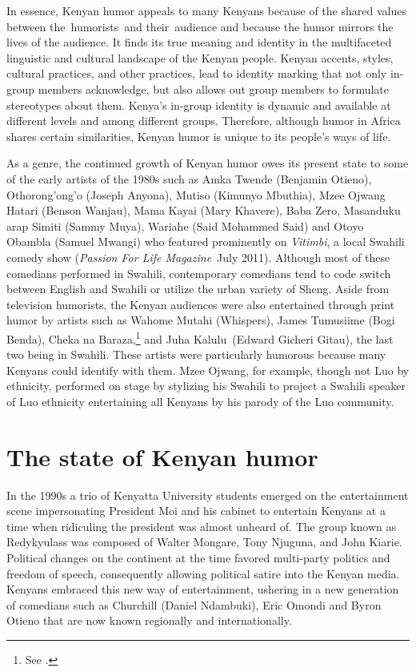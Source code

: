 \documentclass[output=paper]{langsci/langscibook}
\begin{document}
In essence, Kenyan humor appeals to many Kenyans because of the shared values between the~humorists~and their~audience and because the humor mirrors the lives of the audience. It finds its true meaning and identity in the multifaceted linguistic and cultural landscape of the Kenyan people. Kenyan accents, styles, cultural practices, and other practices, lead to identity marking that not only in-group members acknowledge, but also allows out group members to formulate stereotypes about them. Kenya’s in-group identity is dynamic and available at different levels and among different groups. Therefore, although humor in Africa shares certain similarities, Kenyan humor is unique to its people’s ways of life.

As a genre, the continued growth of Kenyan humor owes its present state to some of the early artists of the 1980s such as Amka Twende (Benjamin Otieno), Othorong’ong’o (Joseph Anyona), Mutiso (Kimunyo Mbuthia), Mzee Ojwang Hatari (Benson Wanjau), Mama Kayai (Mary Khavere), Baba Zero, Masanduku arap Simiti (Sammy Muya), Wariahe (Said Mohammed Said) and Otoyo Obambla (Samuel Mwangi) who featured prominently on \textit{Vitimbi}, a local Swahili comedy show (\textit{Passion For Life Magazine}~July 2011). Although most of these comedians performed in Swahili, contemporary comedians tend to code switch between English and Swahili or utilize the urban variety of Sheng. Aside from television humorists, the Kenyan audiences were also entertained through print humor by artists such as Wahome Mutahi (Whispers), James Tumusiime (Bogi Benda), Cheka na Baraza,\footnote{ See \citet{Rhoades1977}.} and Juha Kalulu~(Edward Gicheri Gitau), the last two being in Swahili. These artists were particularly humorous because many Kenyans could identify with them. Mzee Ojwang, for example, though not Luo by ethnicity, performed on stage by stylizing his Swahili to project a Swahili speaker of Luo ethnicity entertaining all Kenyans by his parody of the Luo community.

\section{ The state of Kenyan humor\\
}

   In the 1990s a trio of Kenyatta University students emerged on the entertainment scene impersonating President Moi and his cabinet to entertain Kenyans at a time when ridiculing the president was almost unheard of. The group known as Redykyulass was composed of Walter Mongare, Tony Njuguna, and John Kiarie. Political changes on the continent at the time favored multi-party politics and freedom of speech, consequently allowing political satire into the Kenyan media. Kenyans embraced this new way of entertainment, ushering in a new generation of comedians such as Churchill (Daniel Ndambuki), Eric Omondi and Byron Otieno that are now known regionally and internationally. 
\end{document}
